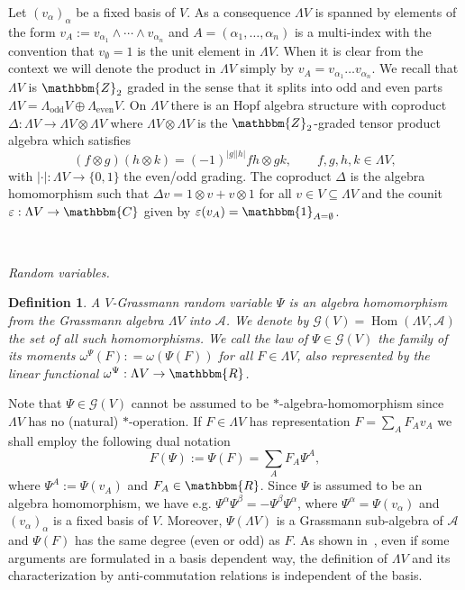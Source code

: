 \documentclass[11pt]{article}
\newcommand{\assign}{:=}
\newcommand{\tmop}[1]{\ensuremath{\operatorname{#1}}}
\newcommand{\tmtextit}[1]{{\itshape{#1}}}
\newtheorem{definition}{Definition}
\begin{document}
Let $(v_{\alpha})_{\alpha}$ be a fixed basis of $V$. As a consequence
$\Lambda V$ is spanned by elements of the form $v_A \assign v_{\alpha_1}
\wedge \cdots \wedge v_{\alpha_n}$ and $A = (\alpha_1, \ldots, \alpha_n)$ is a
multi-index with the convention that $v_{\emptyset} = 1$ is the unit element
in $\Lambda V$. When it is clear from the context we will denote the product
in $\Lambda V$ simply by $v_A = v_{\alpha_1} \ldots v_{\alpha_n}$. We recall
that $\Lambda V$ is $\mathbbm{Z}_2$ graded in the sense that it splits into odd
and even parts $\Lambda V = \Lambda_{\tmop{odd}} V \oplus
\Lambda_{\tmop{even}} V$. On $\Lambda V$ there is an Hopf algebra structure
with coproduct $\Delta : \Lambda V \rightarrow \Lambda V \otimes \Lambda V$
where $\Lambda V \otimes \Lambda V$ is the $\mathbbm{Z}_2$-graded tensor
product algebra which satisfies
\[ (f \otimes g) (h \otimes k) = (- 1)^{| g |  | h |} f h \otimes g k, \qquad
   f, g, h, k \in \Lambda V, \]
with $| \cdot | : \Lambda V \rightarrow \{ 0, 1 \}$ the even/odd grading. The
coproduct $\Delta$ is the algebra homomorphism such that $\Delta v = 1 \otimes
v + v \otimes 1$ for all $v \in V \subseteq \Lambda V$ and the counit
$\varepsilon : \Lambda V \rightarrow \mathbbm{C}$ given by $\varepsilon (v_A)
=\mathbbm{1}_{A = \emptyset}$.

\

\tmtextit{Random variables.}

\begin{definition}
  \label{def:Grassmann-rv}A $V$-Grassmann random variable $\Psi$ is an algebra
  homomorphism from the Grassmann algebra $\Lambda V$ into $\mathcal{A}$. We
  denote by $\mathcal{G} (V) = \tmop{Hom} (\Lambda V, \mathcal{A})$ the set of
  all such homomorphisms. We call the \tmtextit{law} of $\Psi \in \mathcal{G}
  (V)$ the family of its moments $\omega^{\Psi} (F) : = \omega (\Psi (F))$ for
  all $F \in \Lambda V$, also represented by the linear functional
  $\omega^{\Psi} : \Lambda V \rightarrow \mathbbm{R}$.
\end{definition}

Note that $\Psi \in \mathcal{G} (V)$ cannot be assumed to be
$\ast$-algebra-homomorphism since $\Lambda V$ has no (natural)
$\ast$-operation. If $F \in \Lambda V$ has representation $F = \sum_A F_A v_A$
we shall employ the following dual notation
\[ F (\Psi) \assign \Psi (F) = \sum_A F_A \Psi^A, \]
where $\Psi^A \assign \Psi (v_A)$ and $F_A \in \mathbbm{R}$. Since $\Psi$ is
assumed to be an algebra homomorphism, we have e.g. $\Psi^{\alpha}
\Psi^{\beta} = - \Psi^{\beta} \Psi^{\alpha}$, where $\Psi^{\alpha} = \Psi
(v_{\alpha})$ and $(v_{\alpha})_{\alpha}$ is a fixed basis of $V$. Moreover,
$\Psi (\Lambda V)$ is a Grassmann sub-algebra of $\mathcal{A}$ and $\Psi (F)$
has the same degree (even or odd) as $F$. As shown
in~{\cite{van2003algebra1,van2003algebra2}}, even if some arguments are
formulated in a basis dependent way, the definition of $\Lambda V$ and its
characterization by anti-commutation relations is independent of the basis.
\end{document}
